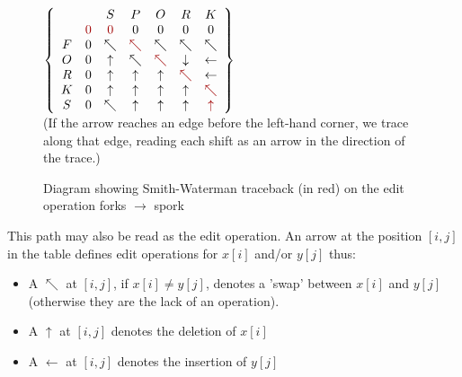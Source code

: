 \documentclass[a4paper,11pt,twoside,notitlepage]{article}
\begin{document}
        \begin{figure}[h!]
          \centering
          $\left\{
                \begin{array}{ccccccc}
                    &   & S & P & O & R & K \\
                    & \color{red}{0} & \color{red}{0} & 0 & 0 & 0 & 0 \\
                  F & 0 & \nwarrow & \color{red}{\nwarrow} & \nwarrow & \nwarrow & \nwarrow \\
                  O & 0 & \uparrow & \nwarrow & \color{red}{\nwarrow} & \downarrow & \leftarrow \\
                  R & 0 & \uparrow & \uparrow & \uparrow & \color{red}{\nwarrow} & \leftarrow \\
                  K & 0 & \uparrow & \uparrow & \uparrow & \uparrow & \color{red}{\nwarrow} \\
                  S & 0 & \nwarrow & \uparrow & \uparrow & \uparrow & \color{red}{\uparrow} \\
                \end{array}\right\} $\\
                (If the arrow reaches an edge before the left-hand
                corner, we trace along that edge, reading each shift
                as an arrow in the direction of the trace.)
                \caption{Diagram showing Smith-Waterman traceback (in
                  red) on the edit operation forks $\rightarrow$
                  spork}
          \label{fig:smith-waterman-traceback}
        \end{figure}

        This path may also be read as the edit operation. An arrow at
        the position $[i,j]$ in the table defines edit operations for
        $x[i]$ and/or $y[j]$ thus:
        \begin{itemize}
          \item A $\nwarrow$ at $[i,j]$, if
        $x[i] \neq y[j]$, denotes a 'swap' between $x[i]$ and $y[j]$
        (otherwise they are the lack of an operation).
          \item A $\uparrow$ at $[i,j]$ denotes the deletion of $x[i]$
          \item A $\leftarrow$ at $[i,j]$ denotes the insertion of $y[j]$
        \end{itemize}
\end{document}
